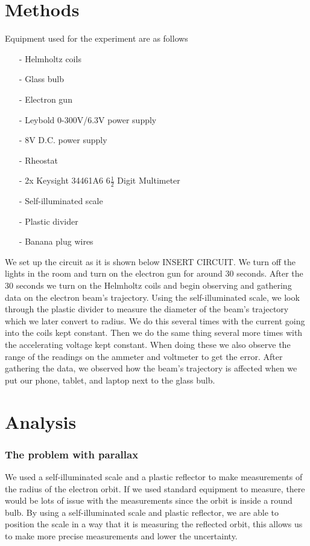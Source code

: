 \documentclass{article}
\begin{document}
\section{Methods}
Equipment used for the experiment are as follows
\begin{itemize}
    \item[-] Helmholtz coils
    \item[-] Glass bulb
    \item[-] Electron gun
    \item[-] Leybold 0-300V/6.3V power supply
    \item[-] 8V D.C. power supply
    \item[-] Rheostat
    \item[-] 2x Keysight 34461A6 6$\frac{1}{2}$ Digit Multimeter
    \item[-] Self-illuminated scale
    \item[-] Plastic divider
    \item[-] Banana plug wires
\end{itemize}
We set up the circuit as it is shown below INSERT CIRCUIT.  We turn off the lights
in the room and turn on the electron gun for around 30 seconds.  After the 30
seconds we turn on the Helmholtz coils and begin observing and gathering data on the
electron beam's trajectory.  Using the self-illuminated scale, we look through the 
plastic divider to measure the diameter of the beam's trajectory which we later 
convert to radius.  We do this several times with the current going into the coils 
kept constant.  Then we do the same thing several more times with the accelerating 
voltage kept constant.  When doing these we also observe the range 
of the readings on the ammeter and voltmeter to get the error.  After gathering the 
data, we observed how the beam's trajectory is affected when we put our phone, tablet, 
and laptop next to the glass bulb.

\section{Analysis}
\subsubsection*{The problem with parallax}
We used a self-illuminated scale and a plastic reflector to make measurements
of the radius of the electron orbit. If we used standard equipment to measure,
there would be lots of issue with the measurements since the orbit is inside a
round bulb. By using a self-illuminated scale and plastic reflector, we are able
to position the scale in a way that it is measuring the reflected orbit, this
allows us to make more precise measurements and lower the uncertainty.
\end{document}
